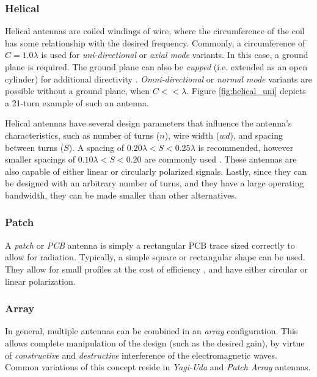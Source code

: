 \subsubsection{Helical}
Helical antennas are coiled windings of wire, where the circumference of the coil has some relationship with the desired frequency. Commonly, a circumference of $C = 1.0 \lambda$ is used for \textit{uni-directional} or \textit{axial mode} variants. In this case, a ground plane is required. The ground plane can also be \textit{cupped} (i.e. extended as an open cylinder) for additional directivity \cite{textbook-antennaTheoryAnalysisDesign}. \textit{Omni-directional} or \textit{normal mode} variants are possible without a ground plane, when $C << \lambda$. Figure \ref{fig:helical_uni} depicts a 21-turn example of such an antenna.

Helical antennas have several design parameters that influence the antenna's characteristics, such as number of turns ($n$), wire width ($wd$), and spacing between turns ($S$). A spacing of $0.20 \lambda < S < 0.25 \lambda$ is recommended, however smaller spacings of $0.10 \lambda < S < 0.20$ are commonly used \cite{site-helicalCalculator}. These antennas are also capable of either linear or circularly polarized signals. Lastly, since they can be designed with an arbitrary number of turns, and they have a large operating bandwidth, they can be made smaller than other alternatives.

\subsubsection{Patch}
A \textit{patch} or \textit{PCB} antenna is simply a rectangular PCB trace sized correctly to allow for radiation. Typically, a simple square or rectangular shape can be used. They allow for small profiles at the cost of efficiency \cite{site-antennaTheory}, and have either circular or linear polarization.

\subsubsection{Array}
In general, multiple antennas can be combined in an \textit{array} configuration. This allows complete manipulation of the design (such as the desired gain), by virtue of \textit{constructive} and \textit{destructive} interference of the electromagnetic waves. Common variations of this concept reside in \textit{Yagi-Uda} and \textit{Patch Array} antennas. \cite{site-antennaTheory}

